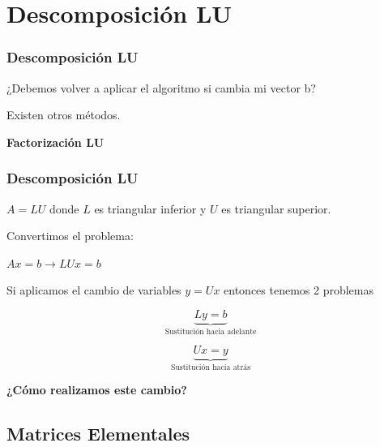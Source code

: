 \documentclass[xcolor=svgnames]{beamer} %
\theoremstyle{plain}
\renewcommand{\textbf}[1]{{\bfseries\textcolor{redUnq2}{#1}}}
\theoremstyle{definition}
\begin{document}
\section{Descomposición LU}

\begin{frame}
\frametitle{Descomposición LU}

¿Debemos volver a aplicar el algoritmo si cambia mi vector b? \vspace{20pt}



Existen otros métodos.\vspace{20pt}



\pause
\begin{tcolorbox}
	\textbf{Factorización LU}
\end{tcolorbox}
\end{frame}

\begin{frame}
\frametitle{Descomposición LU}
$A = L U $ donde $L$ es triangular inferior y $ U$ es triangular superior.

Convertimos el problema:
\begin{center}
	$ A x = b $\pause $ \rightarrow L U x = b$
\end{center}

\pause
Si aplicamos el cambio de variables $ y = U x $ entonces tenemos 2 problemas 

\begin{minipage}{.45\linewidth}
\begin{equation}
 \underbrace{L y = b}_{\text{Sustitución hacia adelante}}
\end{equation}
\end{minipage}  \begin{minipage}{.45\linewidth}
\begin{equation}
\underbrace{ U x = y}_{\text{Sustitución hacia atrás}}
\end{equation} \end{minipage}

\pause
\begin{tcolorbox}
 \begin{center}
   \textbf{¿Cómo realizamos este cambio?} 
 \end{center}
\end{tcolorbox}

\end{frame}

\subsection{Matrices Elementales}
\end{document}

